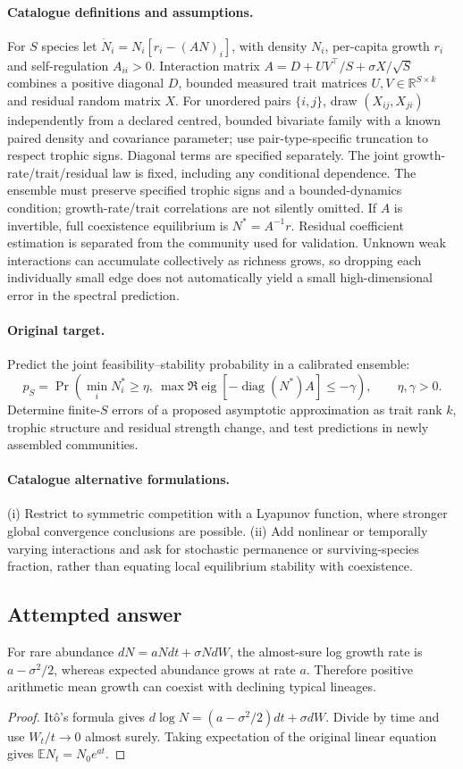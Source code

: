 \documentclass[11pt]{article}
\begin{document}
\paragraph{Catalogue definitions and assumptions.}
For $S$ species let $\dot N_i=N_i[r_i-(AN)_i]$, with density $N_i$, per-capita growth $r_i$ and self-regulation $A_{ii}>0$. Interaction matrix $A=D+UV^\top/S+\sigma X/\sqrt S$ combines a positive diagonal $D$, bounded measured trait matrices $U,V\in\mathbb{R}^{S\times k}$ and residual random matrix $X$. For unordered pairs $\{i,j\}$, draw $(X_{ij},X_{ji})$ independently from a declared centred, bounded bivariate family with a known paired density and covariance parameter; use pair-type-specific truncation to respect trophic signs. Diagonal terms are specified separately. The joint growth-rate/trait/residual law is fixed, including any conditional dependence. The ensemble must preserve specified trophic signs and a bounded-dynamics condition; growth-rate/trait correlations are not silently omitted. If $A$ is invertible, full coexistence equilibrium is $N^*=A^{-1}r$. Residual coefficient estimation is separated from the community used for validation. Unknown weak interactions can accumulate collectively as richness grows, so dropping each individually small edge does not automatically yield a small high-dimensional error in the spectral prediction.
\paragraph{Original target.}
Predict the joint feasibility--stability probability in a calibrated ensemble:
\[
 p_S=\Pr\!\left(\min_iN_i^*\ge\eta,
 \ \max\Re\operatorname{eig}[-\operatorname{diag}(N^*)A]\le-\gamma\right),
 \qquad \eta,\gamma>0.
\]
Determine finite-$S$ errors of a proposed asymptotic approximation as trait rank $k$, trophic structure and residual strength change, and test predictions in newly assembled communities.
\paragraph{Catalogue alternative formulations.}
(i) Restrict to symmetric competition with a Lyapunov function, where stronger global convergence conclusions are possible. (ii) Add nonlinear or temporally varying interactions and ask for stochastic permanence or surviving-species fraction, rather than equating local equilibrium stability with coexistence.
\subsection{Attempted answer}
\begin{proposition}
For rare abundance $dN=aNdt+\sigma N dW$, the almost-sure log growth rate is $a-\sigma^2/2$, whereas expected abundance grows at rate $a$. Therefore positive arithmetic mean growth can coexist with declining typical lineages.
\end{proposition}
\begin{proof}
It\^o's formula gives $d\log N=(a-\sigma^2/2)dt+\sigma dW$. Divide by time and use $W_t/t\to0$ almost surely. Taking expectation of the original linear equation gives $\mathbb{E} N_t=N_0e^{at}$.
\end{proof}
\end{document}

